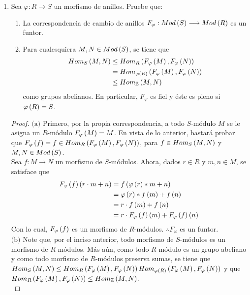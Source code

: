 \documentclass{article}
\begin{document}
\begin{enumerate}[label=\textbf{Ej \arabic*.}]
		\item Sea $\varphi : R \longrightarrow S$ un morfismo de anillos. Pruebe que:
		\begin{enumerate}
			\item La correspondencia de cambio de anillos $F_{\varphi} : Mod\left(S\right) \longrightarrow Mod\left(R\right)$ es un funtor.
			\item Para cualesquiera $M,N \in Mod\left(S\right)$, se tiene que
			\begin{align*}
				Hom_{S}\left(M,N\right) &\leq Hom_{R}\left(F_{\varphi}\left(M\right),F_{\varphi}\left(N\right)\right)\\
				&= Hom_{\varphi \left(R\right)}\left(F_{\varphi}\left(M\right),F_{\varphi}\left(N\right)\right)\\
				&\leq Hom_{\mathbb{Z}}\left(M,N\right)
			\end{align*}
			como grupos abelianos. En particular, $F_{\varphi}$ es fiel y éste es pleno si $\varphi \left(R\right)=S$.
		\end{enumerate}
		\begin{proof}
			$\boxed{\text{(a)}}$ Primero, por la propia correspondencia, a todo $S$-módulo $M$ se le asigna un $R$-módulo $F_{\varphi} \left(M\right)=M$. En vista de lo anterior, bastará probar que $F_{\varphi}\left(f\right) = f \in Hom_{R}\left(F_{\varphi}\left(M\right),F_{\varphi}\left(N\right)\right)$, para $f \in Hom_{S}\left(M,N\right)$ y $M,N \in Mod\left(S\right)$.\\
			
			Sea $f:M \longrightarrow N$ un morfismo de $S$-módulos. Ahora, dados $r \in R$ y $m,n \in M$, se satisface que
			\begin{align*}
				F_{\varphi}\left(f\right)\left(r \cdot m + n\right)&=f\left(\varphi\left(r\right)*m+n\right)\\
				&=\varphi \left(r\right)*f\left(m\right)+f\left(n\right)\\
				&=r \cdot f\left(m\right)+f\left(n\right)\\
				&=r \cdot F_{\varphi} \left(f\right)\left(m\right)+F_{\varphi} \left(f\right)\left(n\right)
			\end{align*}
			Con lo cual, $F_{\varphi} \left(f\right)$ es un morfismo de $R$-módulos. $\therefore F_{\varphi}$ es un funtor.\\
			
			$\boxed{\text{(b)}}$ Note que, por el inciso anterior, todo morfismo de $S$-módulos es un morfismo de $R$-módulos. Más aún, como todo $R$-módulo es un grupo abeliano y como todo morfismo de $R$-módulos preserva sumas, se tiene que $Hom_{S}\left(M,N\right)\leq Hom_{R}\left(F_{\varphi}\left(M\right),F_{\varphi}\left(N\right)\right)Hom_{\varphi \left(R\right)}\left(F_{\varphi}\left(M\right),F_{\varphi}\left(N\right)\right)$ y que $Hom_{R}\left(F_{\varphi}\left(M\right),F_{\varphi}\left(N\right)\right) \leq Hom_{\mathbb{Z}}\left(M,N\right)$.\\
			

\end{proof}
\end{enumerate}
\end{document}
